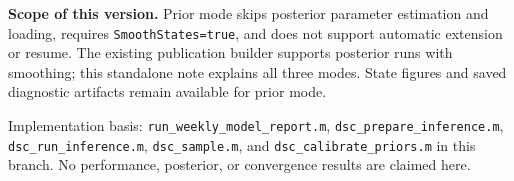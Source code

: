 \documentclass[10pt,a4paper]{article}
\newcommand{\code}[1]{\texttt{#1}}
\begin{document}
\textbf{Scope of this version.} Prior mode skips posterior parameter
estimation and loading, requires \code{SmoothStates=true}, and does not
support automatic extension or resume. The existing publication builder
supports posterior runs with smoothing; this standalone note explains all
three modes. State figures and saved diagnostic artifacts remain available
for prior mode.

{\footnotesize\color{ink}Implementation basis: \code{run\_weekly\_model\_report.m},
\code{dsc\_prepare\_inference.m}, \code{dsc\_run\_inference.m},
\code{dsc\_sample.m}, and \code{dsc\_calibrate\_priors.m} in this branch.
No performance, posterior, or convergence results are claimed here.}
\end{document}

